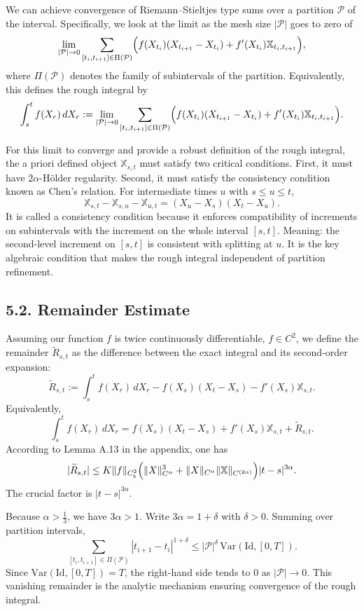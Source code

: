 \documentclass[11pt]{article}
\theoremstyle{definition}
\theoremstyle{remark}
\begin{document}
We can achieve convergence of Riemann--Stieltjes type sums over a partition $\mathcal P$ of the interval. Specifically, we look at the limit as the mesh size $|\mathcal P|$ goes to zero of
\[
\lim_{|\mathcal P|\to0}
\sum_{[t_i,t_{i+1}]\in\Pi(\mathcal P)}
\Bigl(
f(X_{t_i})(X_{t_{i+1}}-X_{t_i})
+f'(X_{t_i})\mathbb{X}_{t_i,t_{i+1}}
\Bigr),
\]
where $\Pi(\mathcal P)$ denotes the family of subintervals of the partition.
Equivalently, this defines the rough integral by
\[
\int_s^t f(X_r)\,dX_r
:=
\lim_{|\mathcal P|\to0}
\sum_{[t_i,t_{i+1}]\in\Pi(\mathcal P)}
\Bigl(
f(X_{t_i})(X_{t_{i+1}}-X_{t_i})
+f'(X_{t_i})\mathbb{X}_{t_i,t_{i+1}}
\Bigr).
\]

For this limit to converge and provide a robust definition of the rough integral, the a priori defined object $\mathbb{X}_{s,t}$ must satisfy two critical conditions. First, it must have $2\alpha$-H\"older regularity. Second, it must satisfy the consistency condition known as Chen's relation. For intermediate times $u$ with $s\le u\le t$,
\[
\mathbb{X}_{s,t}-\mathbb{X}_{s,u}-\mathbb{X}_{u,t}
=(X_u-X_s)(X_t-X_u).
\]
It is called a consistency condition because it enforces compatibility of increments on subintervals with the increment on the whole interval $[s,t]$.
Meaning: the second-level increment on $[s,t]$ is consistent with splitting at $u$. It is the key algebraic condition that makes the rough integral independent of partition refinement.

\subsection*{5.2. Remainder Estimate}
Assuming our function $f$ is twice continuously differentiable, $f\in C^2$, we define the remainder $\widetilde R_{s,t}$ as the difference between the exact integral and its second-order expansion:
\[
\widetilde R_{s,t}
:=
\int_s^t f(X_r)\,dX_r
-f(X_s)(X_t-X_s)
-f'(X_s)\mathbb{X}_{s,t}.
\]
Equivalently,
\[
\int_s^t f(X_r)\,dX_r
=
f(X_s)(X_t-X_s)+f'(X_s)\mathbb{X}_{s,t}+\widetilde R_{s,t}.
\]
According to Lemma A.13 in the appendix, one has
\[
|\widetilde R_{s,t}|
\le
K\|f\|_{C_b^2}
\Bigl(
\|X\|_{C^\alpha}^3
+\|X\|_{C^\alpha}\|\mathbb{X}\|_{C^{(2\alpha)}}
\Bigr)
|t-s|^{3\alpha}.
\]
The crucial factor is $|t-s|^{3\alpha}$.

Because $\alpha>\frac13$, we have $3\alpha>1$. Write $3\alpha=1+\delta$ with $\delta>0$. Summing over partition intervals,
\[
\sum_{[t_i,t_{i+1}]\in\Pi(\mathcal P)} |t_{i+1}-t_i|^{1+\delta}
\le
|\mathcal P|^\delta\,\mathrm{Var}(\mathrm{Id},[0,T]).
\]
Since $\mathrm{Var}(\mathrm{Id},[0,T])=T$, the right-hand side tends to $0$ as $|\mathcal P|\to0$. This vanishing remainder is the analytic mechanism ensuring convergence of the rough integral.
\end{document}
